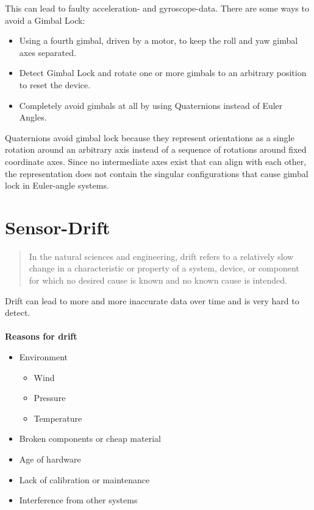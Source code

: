 This can lead to faulty acceleration- and gyroscope-data. There are some ways to avoid a Gimbal Lock:
\begin{itemize}
    \item Using a fourth gimbal, driven by a motor, to keep the roll and yaw gimbal axes separated.
    \item Detect Gimbal Lock and rotate one or more gimbals to an arbitrary position to reset the device.
    \item Completely avoid gimbals at all by using Quaternions instead of Euler Angles.
\end{itemize}
Quaternions avoid gimbal lock because they represent orientations as a single rotation around an arbitrary axis instead of a sequence of rotations around fixed coordinate axes. Since no intermediate axes exist that can align with each other, the representation does not contain the singular configurations that cause gimbal lock in Euler-angle systems.

\noindent\cite{LRWeb:17}
\section{Sensor-Drift}
\begin{quote}
    In the natural sciences and engineering, drift refers to a relatively slow change in a characteristic or property of a system, device, or component for which no desired cause is known and no known cause is intended.
\end{quote}
\noindent\cite{LRWeb:12}

Drift can lead to more and more inaccurate data over time and is very hard to detect.\\\\
{\large \textbf{Reasons for drift}}\label{title:drift}
\begin{itemize}
    \item Environment
    \begin{itemize}
        \item Wind
        \item Pressure
        \item Temperature
    \end{itemize}
    \item Broken components or cheap material
    \item Age of hardware
    \item Lack of calibration or maintenance
    \item Interference from other systems
\end{itemize}

